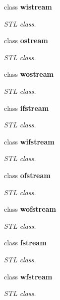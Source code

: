 \begin{CompactItemize}
class \textbf{wistream}
\begin{CompactList}\small\item\em STL class. \item\end{CompactList}\item 
class \textbf{ostream}
\begin{CompactList}\small\item\em STL class. \item\end{CompactList}\item 
class \textbf{wostream}
\begin{CompactList}\small\item\em STL class. \item\end{CompactList}\item 
class \textbf{ifstream}
\begin{CompactList}\small\item\em STL class. \item\end{CompactList}\item 
class \textbf{wifstream}
\begin{CompactList}\small\item\em STL class. \item\end{CompactList}\item 
class \textbf{ofstream}
\begin{CompactList}\small\item\em STL class. \item\end{CompactList}\item 
class \textbf{wofstream}
\begin{CompactList}\small\item\em STL class. \item\end{CompactList}\item 
class \textbf{fstream}
\begin{CompactList}\small\item\em STL class. \item\end{CompactList}\item 
class \textbf{wfstream}
\begin{CompactList}\small\item\em STL class. \item\end{CompactList}\item 

\end{CompactItemize}
